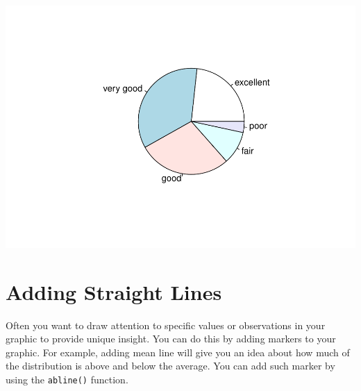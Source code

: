 \documentclass[
]{book}
\newenvironment{Shaded}{\begin{snugshade}}{\end{snugshade}}
\newcommand{\CommentTok}[1]{\textcolor[rgb]{0.56,0.35,0.01}{\textit{#1}}}
\newcommand{\DataTypeTok}[1]{\textcolor[rgb]{0.13,0.29,0.53}{#1}}
\newcommand{\DecValTok}[1]{\textcolor[rgb]{0.00,0.00,0.81}{#1}}
\newcommand{\KeywordTok}[1]{\textcolor[rgb]{0.13,0.29,0.53}{\textbf{#1}}}
\newcommand{\NormalTok}[1]{#1}
\newcommand{\OperatorTok}[1]{\textcolor[rgb]{0.81,0.36,0.00}{\textbf{#1}}}
\newcommand{\StringTok}[1]{\textcolor[rgb]{0.31,0.60,0.02}{#1}}
\begin{document}
\includegraphics{_main_files/figure-latex/unnamed-chunk-184-1.pdf}

\hypertarget{adding-straight-lines}{%
\section{Adding Straight Lines}\label{adding-straight-lines}}

Often you want to draw attention to specific values or observations in your graphic to provide unique insight. You can do this by adding markers to your graphic. For example, adding mean line will give you an idea about how much of the distribution is above and below the average. You can add such marker by using the \texttt{abline()} function.

\begin{Shaded}
\end{Shaded}
\end{document}

